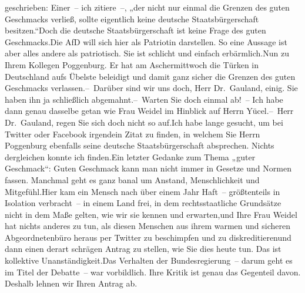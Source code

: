 \documentclass{article}
\begin{document}
geschrieben: Einer – ich zitiere –, „der nicht nur einmal die Grenzen des guten Geschmacks verließ, sollte eigentlich keine deutsche Staatsbürgerschaft besitzen.“Doch die deutsche Staatsbürgerschaft ist keine Frage des guten Geschmacks.Die AfD will sich hier als Patriotin darstellen. So eine Aussage ist aber alles andere als patriotisch. Sie ist schlicht und einfach erbärmlich.Nun zu Ihrem Kollegen Poggenburg. Er hat am Aschermittwoch die Türken in Deutschland aufs Übelste beleidigt und damit ganz sicher die Grenzen des guten Geschmacks verlassen.– Darüber sind wir uns doch, Herr Dr. Gauland, einig. Sie haben ihn ja schließlich abgemahnt.– Warten Sie doch einmal ab! – Ich habe dann genau dasselbe getan wie Frau Weidel im Hinblick auf Herrn Yücel.– Herr Dr. Gauland, regen Sie sich doch nicht so auf.Ich habe lange gesucht, um bei Twitter oder Facebook irgendein Zitat zu finden, in welchem Sie Herrn Poggenburg ebenfalls seine deutsche Staatsbürgerschaft absprechen. Nichts dergleichen konnte ich finden.Ein letzter Gedanke zum Thema „guter Geschmack“: Guten Geschmack kann man nicht immer in Gesetze und Normen fassen. Manchmal geht es ganz banal um Anstand, Menschlichkeit und Mitgefühl.Hier kam ein Mensch nach über einem Jahr Haft – größtenteils in Isolation verbracht – in einem Land frei, in dem rechtsstaatliche Grundsätze nicht in dem Maße gelten, wie wir sie kennen und erwarten,und Ihre Frau Weidel hat nichts anderes zu tun, als diesen Menschen aus ihrem warmen und sicheren Abgeordnetenbüro heraus per Twitter zu beschimpfen und zu diskreditierenund dann einen derart schrägen Antrag zu stellen, wie Sie dies heute tun. Das ist kollektive Unanständigkeit.Das Verhalten der Bundesregierung – darum geht es im Titel der Debatte – war vorbildlich. Ihre Kritik ist genau das Gegenteil davon. Deshalb lehnen wir Ihren Antrag ab.
\end{document}
